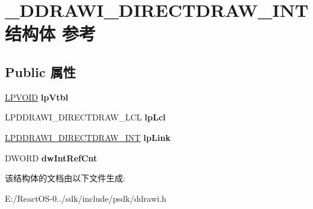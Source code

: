 \hypertarget{struct___d_d_r_a_w_i___d_i_r_e_c_t_d_r_a_w___i_n_t}{}\section{\+\_\+\+D\+D\+R\+A\+W\+I\+\_\+\+D\+I\+R\+E\+C\+T\+D\+R\+A\+W\+\_\+\+I\+N\+T结构体 参考}
\label{struct___d_d_r_a_w_i___d_i_r_e_c_t_d_r_a_w___i_n_t}
\subsection*{Public 属性}
\begin{DoxyCompactItemize}
\item 
\mbox{\label{struct___d_d_r_a_w_i___d_i_r_e_c_t_d_r_a_w___i_n_t_af47382d4f28304acdd7e2cce0749c826}} 
\hyperlink{interfacevoid}{L\+P\+V\+O\+ID} {\bfseries lp\+Vtbl}
\item 
\mbox{\label{struct___d_d_r_a_w_i___d_i_r_e_c_t_d_r_a_w___i_n_t_a5f78b53ebd07fbc05d40a3717229463d}} 
L\+P\+D\+D\+R\+A\+W\+I\+\_\+\+D\+I\+R\+E\+C\+T\+D\+R\+A\+W\+\_\+\+L\+CL {\bfseries lp\+Lcl}
\item 
\mbox{\label{struct___d_d_r_a_w_i___d_i_r_e_c_t_d_r_a_w___i_n_t_a9b3924e03144e322281462b917f3480c}} 
\hyperlink{struct___d_d_r_a_w_i___d_i_r_e_c_t_d_r_a_w___i_n_t}{L\+P\+D\+D\+R\+A\+W\+I\+\_\+\+D\+I\+R\+E\+C\+T\+D\+R\+A\+W\+\_\+\+I\+NT} {\bfseries lp\+Link}
\item 
\mbox{\label{struct___d_d_r_a_w_i___d_i_r_e_c_t_d_r_a_w___i_n_t_a1c3ec08144ebd36dfd236b5ef56c7a02}} 
D\+W\+O\+RD {\bfseries dw\+Int\+Ref\+Cnt}
\end{DoxyCompactItemize}


该结构体的文档由以下文件生成\+:\begin{DoxyCompactItemize}
\item 
E\+:/\+React\+O\+S-\/0../sdk/include/psdk/ddrawi.\+h\end{DoxyCompactItemize}
